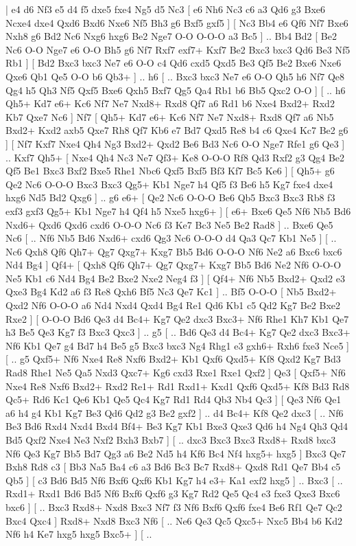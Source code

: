 \makegametitle 
|   e4   d6    Nf3   e5    d4   f5    dxe5   fxe4    Ng5   d5    Nc3 [  e6 Nh6  Nc3 c6  a3 Qd6  g3 Bxe6  Ncxe4 dxe4  Qxd6 Bxd6  Nxe6 Nf5  Bh3 g6  Bxf5 gxf5   ]  [  Nc3 Bb4  e6 Qf6  Nf7 Bxe6  Nxh8 g6  Bd2 Nc6  Nxg6 hxg6  Be2 Nge7  O-O O-O-O  a3 Bc5   ] .. Bb4    Bd2 [  Be2 Nc6  O-O Nge7  e6 O-O  Bh5 g6  Nf7 Rxf7  exf7+ Kxf7  Be2 Bxc3  bxc3 Qd6  Be3 Nf5  Rb1   ]  [  Bd2 Bxc3  bxc3 Ne7  e6 O-O  c4 Qd6  cxd5 Qxd5  Be3 Qf5  Be2 Bxe6  Nxe6 Qxe6  Qb1 Qe5  O-O b6  Qb3+   ] .. h6 [ .. Bxc3  bxc3 Ne7  e6 O-O  Qh5 h6  Nf7 Qe8  Qg4 h5  Qh3 Nf5  Qxf5 Bxe6  Qxh5 Bxf7  Qg5 Qa4  Rb1 b6  Bb5 Qxc2  O-O   ]  [ .. h6  Qh5+ Kd7  e6+ Kc6  Nf7 Ne7  Nxd8+ Rxd8  Qf7 a6  Rd1 b6  Nxe4 Bxd2+  Rxd2 Kb7  Qxe7 Nc6   ]  Nf7 [  Qh5+ Kd7  e6+ Kc6  Nf7 Ne7  Nxd8+ Rxd8  Qf7 a6  Nb5 Bxd2+  Kxd2 axb5  Qxe7 Rh8  Qf7 Kb6  e7 Bd7  Qxd5 Re8  b4 c6  Qxe4 Kc7  Be2 g6   ]  [  Nf7 Kxf7  Nxe4 Qh4  Ng3 Bxd2+  Qxd2 Be6  Bd3 Nc6  O-O Nge7  Rfe1 g6  Qe3   ] .. Kxf7    Qh5+ [  Nxe4 Qh4  Nc3 Ne7  Qf3+ Ke8  O-O-O Rf8  Qd3 Rxf2  g3 Qg4  Be2 Qf5  Be1 Bxc3  Bxf2 Bxe5  Rhe1 Nbc6  Qxf5 Bxf5  Bf3 Kf7  Bc5 Ke6   ]  [  Qh5+ g6  Qe2 Nc6  O-O-O Bxc3  Bxc3 Qg5+  Kb1 Nge7  h4 Qf5  f3 Be6  h5 Kg7  fxe4 dxe4  hxg6 Nd5  Bd2 Qxg6   ] .. g6    e6+ [  Qe2 Nc6  O-O-O Be6  Qb5 Bxc3  Bxc3 Rb8  f3 exf3  gxf3 Qg5+  Kb1 Nge7  h4 Qf4  h5 Nxe5  hxg6+   ]  [  e6+ Bxe6  Qe5 Nf6  Nb5 Bd6  Nxd6+ Qxd6  Qxd6 cxd6  O-O-O Nc6  f3 Ke7  Bc3 Ne5  Be2 Rad8   ] .. Bxe6    Qe5   Nc6 [ .. Nf6  Nb5 Bd6  Nxd6+ cxd6  Qg3 Nc6  O-O-O d4  Qa3 Qc7  Kb1 Ne5   ]  [ .. Nc6  Qxh8 Qf6  Qh7+ Qg7  Qxg7+ Kxg7  Bb5 Bd6  O-O-O Nf6  Ne2 a6  Bxc6 bxc6  Nd4 Bg4   ]  Qf4+ [  Qxh8 Qf6  Qh7+ Qg7  Qxg7+ Kxg7  Bb5 Bd6  Ne2 Nf6  O-O-O Ne5  Kb1 c6  Nd4 Bg4  Be2 Bxe2  Nxe2 Neg4  f3   ]  [  Qf4+ Nf6  Nb5 Bxd2+  Qxd2 e3  Qxe3 Bg4  Kd2 a6  f3 Re8  Qxh6 Bf5  Nc3 Qe7  Kc1   ] .. Bf5    O-O-O [  Nb5 Bxd2+  Qxd2 Nf6  O-O-O a6  Nd4 Nxd4  Qxd4 Bg4  Re1 Qd6  Kb1 c5  Qd2 Kg7  Be2 Bxe2  Rxe2   ]  [  O-O-O Bd6  Qe3 d4  Bc4+ Kg7  Qe2 dxc3  Bxc3+ Nf6  Rhe1 Kh7  Kb1 Qe7  h3 Be5  Qe3 Kg7  f3 Bxc3  Qxc3   ] .. g5 [ .. Bd6  Qe3 d4  Bc4+ Kg7  Qe2 dxc3  Bxc3+ Nf6  Kb1 Qe7  g4 Bd7  h4 Be5  g5 Bxc3  bxc3 Ng4  Rhg1 e3  gxh6+ Rxh6  fxe3 Nce5   ]  [ .. g5  Qxf5+ Nf6  Nxe4 Re8  Nxf6 Bxd2+  Kb1 Qxf6  Qxd5+ Kf8  Qxd2 Kg7  Bd3 Rad8  Rhe1 Ne5  Qa5 Nxd3  Qxc7+ Kg6  cxd3 Rxe1  Rxe1 Qxf2   ]  Qe3 [  Qxf5+ Nf6  Nxe4 Re8  Nxf6 Bxd2+  Rxd2 Re1+  Rd1 Rxd1+  Kxd1 Qxf6  Qxd5+ Kf8  Bd3 Rd8  Qc5+ Rd6  Kc1 Qe6  Kb1 Qe5  Qc4 Kg7  Rd1 Rd4  Qb3 Nb4  Qc3   ]  [  Qe3 Nf6  Qe1 a6  h4 g4  Kb1 Kg7  Be3 Qd6  Qd2 g3  Be2 gxf2   ] .. d4    Bc4+   Kf8    Qe2   dxc3 [ .. Nf6  Be3 Bd6  Rxd4 Nxd4  Bxd4 Bf4+  Be3 Kg7  Kb1 Bxe3  Qxe3 Qd6  h4 Ng4  Qh3 Qd4  Bd5 Qxf2  Nxe4 Ne3  Nxf2 Bxh3  Bxb7   ]  [ .. dxc3  Bxc3 Bxc3  Rxd8+ Rxd8  bxc3 Nf6  Qe3 Kg7  Bb5 Bd7  Qg3 a6  Be2 Nd5  h4 Kf6  Bc4 Nf4  hxg5+ hxg5   ]  Bxc3   Qe7    Bxh8   Rd8    c3 [  Bb3 Na5  Ba4 c6  a3 Bd6  Bc3 Bc7  Rxd8+ Qxd8  Rd1 Qe7  Bb4 c5  Qb5   ]  [  c3 Bd6  Bd5 Nf6  Bxf6 Qxf6  Kb1 Kg7  h4 e3+  Ka1 exf2  hxg5   ] .. Bxc3 [ .. Rxd1+  Rxd1 Bd6  Bd5 Nf6  Bxf6 Qxf6  g3 Kg7  Rd2 Qe5  Qc4 e3  fxe3 Qxe3  Bxc6 bxc6   ]  [ .. Bxc3  Rxd8+ Nxd8  Bxc3 Nf7  f3 Nf6  Bxf6 Qxf6  fxe4 Be6  Rf1 Qe7  Qc2 Bxc4  Qxc4   ]  Rxd8+   Nxd8    Bxc3   Nf6 [ .. Ne6  Qe3 Qc5  Qxc5+ Nxc5  Bb4 b6  Kd2 Nf6  h4 Ke7  hxg5 hxg5  Bxc5+   ]  [ .. 